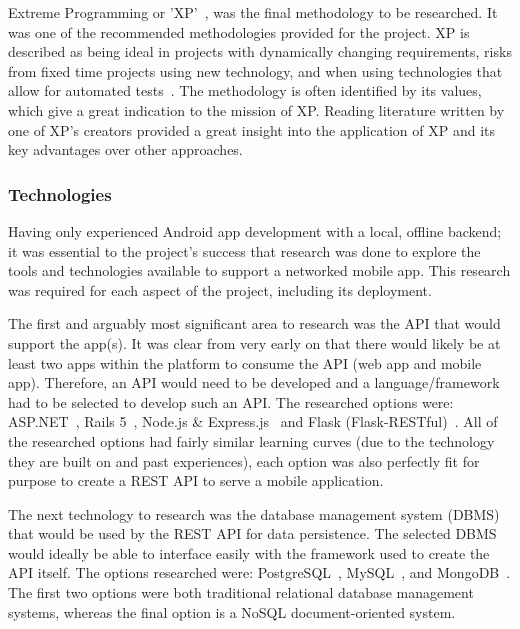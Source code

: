 Extreme Programming or 'XP'~\cite{xp_explained_ref, xp_agilealliance_ref}, was the final methodology to be researched. It was one of the recommended methodologies provided for the project. XP is described as being ideal in projects with dynamically changing requirements, risks from fixed time projects using new technology, and when using technologies that allow for automated tests~\cite{xp_agilealliance_ref}. The methodology is often identified by its values, which give a great indication to the mission of XP. Reading literature written by one of XP's creators provided a great insight into the application of XP and its key advantages over other approaches.

\subsubsection{Technologies}
Having only experienced Android app development with a local, offline backend; it was essential to the project's success that research was done to explore the tools and technologies available to support a networked mobile app. This research was required for each aspect of the project, including its deployment.

The first and arguably most significant area to research was the API that would support the app(s). It was clear from very early on that there would likely be at least two apps within the platform to consume the API (web app and mobile app).  Therefore, an API would need to be developed and a language/framework had to be selected to develop such an API. The researched options were: ASP.NET~\cite{dotnet_documentation_ref}, Rails 5~\cite{rails_documentation_ref}, Node.js \& Express.js~\cite{nodejs_documentation_ref, expressjs_documentation_ref} and Flask (Flask-RESTful)~\cite{flask_documentation_ref}. All of the researched options had fairly similar learning curves (due to the technology they are built on and past experiences), each option was also perfectly fit for purpose to create a REST API  to serve a mobile application.

The next technology to research was the database management system (DBMS) that would be used by the REST API for data persistence. The selected DBMS would ideally be able to interface easily with the framework used to create the API itself. The options researched were: PostgreSQL~\cite{postgres_documentation_ref}, MySQL~\cite{mysql_documentation_ref}, and MongoDB~\cite{mongodb_documentation_ref}. The first two options were both traditional relational database management systems, whereas the final option is a NoSQL document-oriented system.


